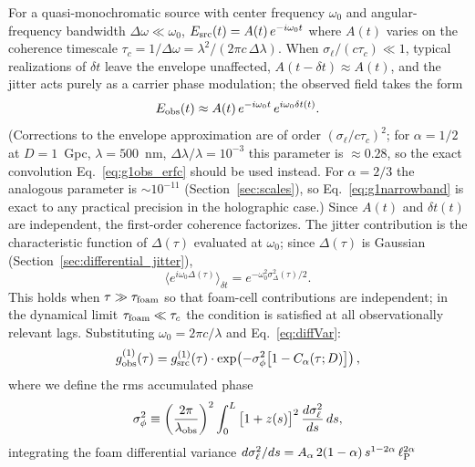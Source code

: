 \documentclass[aps,prd,onecolumn,amsmath,amssymb]{revtex4-2}
\begin{document}
For a quasi-monochromatic source with center frequency $\omega_0$ and
angular-frequency bandwidth $\Delta\omega \ll \omega_0$, 
$E_{\rm src}(t) = A(t)\,e^{-i\omega_0 t}$
where $A(t)$ varies on the coherence timescale
$\tau_c = 1/\Delta\omega = \lambda^2/(2\pi c\,\Delta\lambda)$.
When $\sigma_\ell/(c\tau_c) \ll 1$, typical realizations of $\delta t$ leave the
envelope unaffected, $A(t-\delta t) \approx A(t)$, and the jitter acts purely as
a carrier phase modulation; the observed field takes the form
\begin{equation}
  E_{\rm obs}(t) \approx A(t)\,e^{-i\omega_0 t}\,e^{i\omega_0\delta t(t)}.
  \label{eq:Eobs_narrowband}
\end{equation}
(Corrections to the envelope approximation are of order $(\sigma_\ell/c\tau_c)^2$;
for $\alpha=1/2$ at $D=1$~Gpc, $\lambda=500$~nm, $\Delta\lambda/\lambda=10^{-3}$
this parameter is $\approx 0.28$, so the exact convolution Eq.~\eqref{eq:g1obs_erfc}
should be used instead.
For $\alpha=2/3$ the analogous parameter is ${\sim}10^{-11}$
(Section~\ref{sec:scales}), so Eq.~\eqref{eq:g1narrowband} is exact to any
practical precision in the holographic case.)
Since $A(t)$ and $\delta t(t)$ are independent, the first-order coherence
factorizes.
The jitter contribution is the characteristic function of $\Delta(\tau)$
evaluated at $\omega_0$; since $\Delta(\tau)$ is Gaussian
(Section~\ref{sec:differential_jitter}),
\begin{equation}
  \big\langle e^{i\omega_0\Delta(\tau)}\big\rangle_{\delta t}
  = e^{-\omega_0^2\sigma_\Delta^2(\tau)/2}.
\end{equation}
This holds when $\tau \gg \tau_{\rm foam}$ so that foam-cell contributions are
independent; in the dynamical limit $\tau_{\rm foam} \ll \tau_c$ the condition
is satisfied at all observationally relevant lags.
Substituting $\omega_0 = 2\pi c/\lambda$ and Eq.~\eqref{eq:diffVar}:
\begin{equation}
  g^{(1)}_{\rm obs}(\tau)
    = g^{(1)}_{\rm src}(\tau)\cdot
      \exp\!\left(-\sigma_\phi^2\big[1 - C_\alpha(\tau;D)\big]\right),
  \label{eq:g1narrowband}
\end{equation}
where we define the rms accumulated phase
\begin{equation}
  \sigma_\phi^2 \equiv \left(\frac{2\pi}{\lambda_{\rm obs}}\right)^2
  \int_0^{L} \big[1+z(s)\big]^2\,\frac{d\sigma_\ell^2}{ds}\,ds,
  \label{eq:sigmaphi}
\end{equation}
integrating the foam differential variance
$d\sigma_\ell^2/ds = A_\alpha\,2(1-\alpha)\,s^{1-2\alpha}\,\ell_{\rm P}^{2\alpha}$
\end{document}
